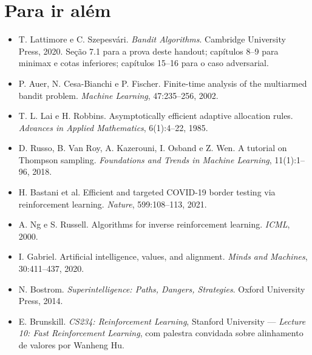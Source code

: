 \documentclass[11pt]{article}
\begin{document}
\section{Para ir além}

{\small
\begin{itemize}[itemsep=0.25ex]
  \item T. Lattimore e C. Szepesvári. \emph{Bandit Algorithms}. Cambridge
        University Press, 2020. Seção 7.1 para a prova deste handout;
        capítulos 8--9 para minimax e cotas inferiores;
        capítulos 15--16 para o caso adversarial.
  \item P. Auer, N. Cesa-Bianchi e P. Fischer. Finite-time analysis of the
        multiarmed bandit problem. \emph{Machine Learning}, 47:235--256, 2002.
  \item T. L. Lai e H. Robbins. Asymptotically efficient adaptive allocation
        rules. \emph{Advances in Applied Mathematics}, 6(1):4--22, 1985.
  \item D. Russo, B. Van Roy, A. Kazerouni, I. Osband e Z. Wen. A tutorial on
        Thompson sampling. \emph{Foundations and Trends in Machine Learning},
        11(1):1--96, 2018.
  \item H. Bastani et al. Efficient and targeted COVID-19 border testing via
        reinforcement learning. \emph{Nature}, 599:108--113, 2021.
  \item A. Ng e S. Russell. Algorithms for inverse reinforcement learning.
        \emph{ICML}, 2000.
  \item I. Gabriel. Artificial intelligence, values, and alignment.
        \emph{Minds and Machines}, 30:411--437, 2020.
  \item N. Bostrom. \emph{Superintelligence: Paths, Dangers, Strategies}.
        Oxford University Press, 2014.
  \item E. Brunskill. \emph{CS234: Reinforcement Learning}, Stanford University
        --- \emph{Lecture 10: Fast Reinforcement Learning}, com palestra
        convidada sobre alinhamento de valores por Wanheng Hu.
\end{itemize}}
\end{document}
